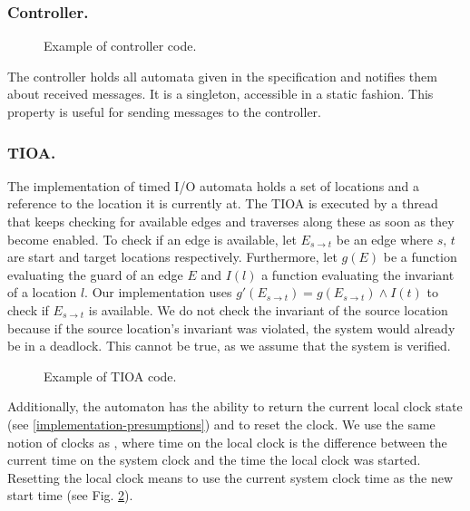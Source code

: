 \subsubsection{Controller.}

\begin{figure}[t]

\caption{Example of controller code.}
\label{controller-example}
\end{figure}

The controller holds all automata given in the specification and notifies them
about received messages. It is a singleton, accessible in a static fashion.
This property is useful for sending messages to the controller.

\subsubsection{TIOA.}

The implementation of timed I/O automata holds a set of locations and a
reference to the location it is currently at. The TIOA is executed by a thread
that keeps checking for available edges and traverses along these as soon as
they become enabled. To check if an edge is available, let $E_{s\rightarrow t}$
be an edge where $s,\, t$ are start and target locations
respectively. Furthermore, let $g(E)$ be a function evaluating the guard of an
edge $E$ and $I(l)$ a function evaluating the invariant of a location $l$. Our
implementation uses $g'(E_{s\rightarrow t})=g(E_{s\rightarrow t})\wedge I(t)$ to
check if $E_{s\rightarrow t}$ is available. We do not check the invariant of the
source location because if the source location's invariant was violated, the
system would already be in a deadlock. This cannot be true, as we assume that
the system is verified.

\begin{figure}[t]

\caption{Example of TIOA code.}
\label{tioa-example}
\end{figure}

Additionally, the automaton has the ability to return the current
local clock state (see \ref{implementation-presumptions}) and to
reset the clock. We use the same notion of clocks as \cite{amnell_code_2002},
where time on the local clock is the difference between the current
time on the system clock and the time the local clock was started.
Resetting the local clock means to use the current system clock time
as the new start time (see Fig. \ref{tioa-example}).


